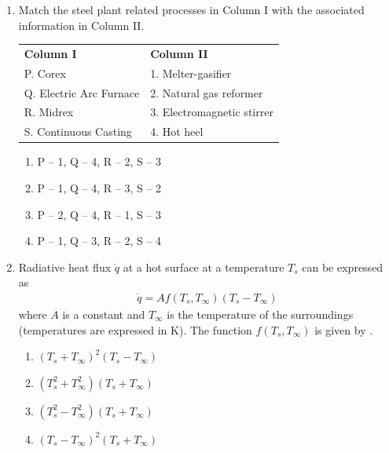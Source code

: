 \documentclass[journal]{IEEEtran}
\theoremstyle{remark}
\begin{document}
\begin{enumerate}[resume]
\item Match the steel plant related processes in Column I with the associated information in Column II. \hfill{}
\begin{center}
\begin{tabular}{ll}
\textbf{Column I} & \textbf{Column II} \\
P. Corex & 1. Melter-gasifier \\
Q. Electric Arc Furnace & 2. Natural gas reformer \\
R. Midrex & 3. Electromagnetic stirrer \\
S. Continuous Casting & 4. Hot heel \\
\end{tabular}
\end{center}
\begin{enumerate}
\item P – 1, Q – 4, R – 2, S – 3
\item P – 1, Q – 4, R – 3, S – 2
\item P – 2, Q – 4, R – 1, S – 3
\item P – 1, Q – 3, R – 2, S – 4
\end{enumerate}

\item Radiative heat flux $\dot{q}$ at a hot surface at a temperature $T_s$ can be expressed as \hfill{}
\begin{align}
\dot{q} = A f(T_s, T_\infty) (T_s - T_\infty) 
\end{align}
where $A$ is a constant and $T_\infty$ is the temperature of the surroundings (temperatures are expressed in K). The function $f(T_s, T_\infty)$ is given by \underline{\hspace{2cm}}.
\begin{enumerate}
\item $(T_s + T_\infty)^2(T_s - T_\infty)$
\item $(T_s^2 + T_\infty^2)(T_s + T_\infty)$
\item $(T_s^2 - T_\infty^2) (T_s + T_\infty)$
\item $(T_s - T_\infty)^2(T_s + T_\infty)$
\end{enumerate}


\end{enumerate}
\end{document}
